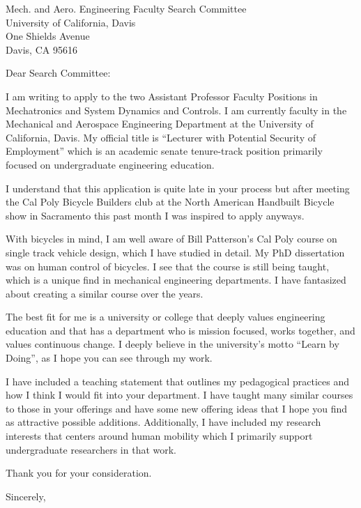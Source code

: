 \documentclass{letter}
\date{March 19, 2018}
\begin{document}
\begin{letter}{
  Mech. and Aero. Engineering Faculty Search Committee \\
  University of California, Davis \\
  One Shields Avenue \\
  Davis, CA 95616}
\opening{Dear Search Committee:}

I am writing to apply to the two Assistant Professor Faculty Positions in
Mechatronics and System Dynamics and Controls. I am currently faculty in the
Mechanical and Aerospace Engineering Department at the University of
California, Davis. My official title is ``Lecturer with Potential Security of
Employment'' which is an academic senate tenure-track position primarily
focused on undergraduate engineering education.

I understand that this application is quite late in your process but after
meeting the Cal Poly Bicycle Builders club at the North American Handbuilt
Bicycle show in Sacramento this past month I was inspired to apply anyways.

With bicycles in mind, I am well aware of Bill Patterson's Cal Poly course on
single track vehicle design, which I have studied in detail. My PhD
dissertation was on human control of bicycles. I see that the course is still
being taught, which is a unique find in mechanical engineering departments. I
have fantasized about creating a similar course over the years.

The best fit for me is a university or college that deeply values engineering
education and that has a department who is mission focused, works together, and
values continuous change. I deeply believe in the university's motto ``Learn by
Doing'', as I hope you can see through my work.

I have included a teaching statement that outlines my pedagogical practices and
how I think I would fit into your department. I have taught many similar
courses to those in your offerings and have some new offering ideas that I hope
you find as attractive possible additions. Additionally, I have included my
research interests that centers around human mobility which I primarily support
undergraduate researchers in that work.

Thank you for your consideration.

\closing{Sincerely,}

\end{letter}
\end{document}

